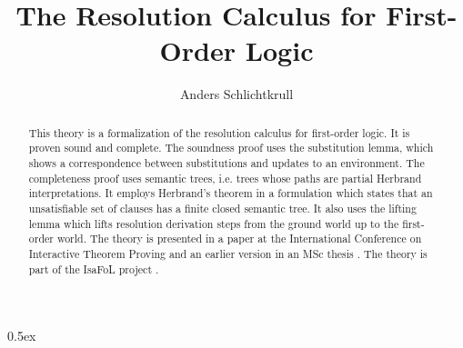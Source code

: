 \documentclass[11pt,a4paper]{article}
\begin{document}
\title{The Resolution Calculus for First-Order Logic}
\author{Anders Schlichtkrull}
\maketitle
\begin{abstract}
This theory is a formalization of the resolution calculus for first-order logic. It is proven sound and complete. The soundness proof uses the substitution lemma, which shows a correspondence between substitutions and updates to an environment. The completeness proof uses semantic trees, i.e. trees whose paths are partial Herbrand interpretations. It employs Herbrand's theorem in a formulation which states that an unsatisfiable set of clauses has a finite closed semantic tree. It also uses the lifting lemma which lifts resolution derivation steps from the ground world up to the first-order world. The theory is presented in a paper at the International Conference on Interactive Theorem Proving \cite{schlichtkrull} and an earlier version in an MSc thesis \cite{thesis}. The theory is part of the IsaFoL project \cite{isafol}.
\end{abstract}

\tableofcontents

\parindent 0pt\parskip 0.5ex





\end{document}
